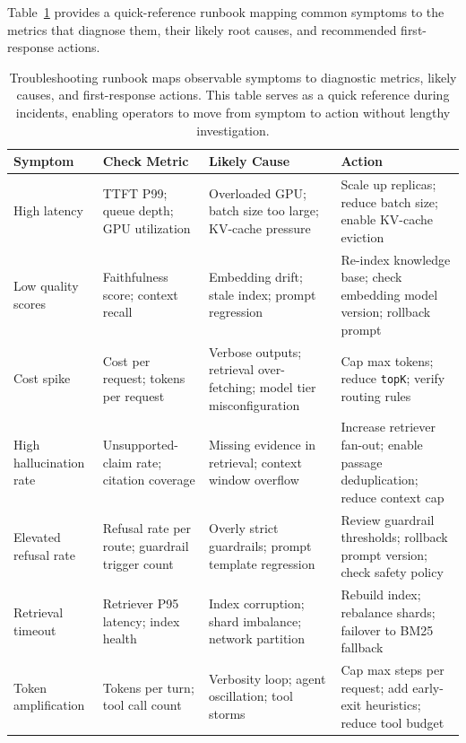 Table~\ref{tab:ch05_troubleshooting_runbook} provides a quick-reference runbook mapping common symptoms to the metrics that diagnose them, their likely root causes, and recommended first-response actions.

\begin{table}[t]
\centering
\small
\caption{Troubleshooting runbook maps observable symptoms to diagnostic metrics, likely causes, and first-response actions. This table serves as a quick reference during incidents, enabling operators to move from symptom to action without lengthy investigation.}
\label{tab:ch05_troubleshooting_runbook}
\setlength{\tabcolsep}{5pt}
\renewcommand{\arraystretch}{1.3}
\begin{tabularx}{\linewidth}{@{}>{\raggedright\arraybackslash}p{2.4cm}>{\raggedright\arraybackslash}p{2.4cm}>{\raggedright\arraybackslash}X>{\raggedright\arraybackslash}X@{}}
\toprule
\rowcolor{gray!15}
\textbf{Symptom} & \textbf{Check Metric} & \textbf{Likely Cause} & \textbf{Action} \\
\midrule
High latency & TTFT P99; queue depth; GPU utilization & Overloaded GPU; batch size too large; KV-cache pressure & Scale up replicas; reduce batch size; enable KV-cache eviction \\
\addlinespace[2pt]
Low quality scores & Faithfulness score; context recall & Embedding drift; stale index; prompt regression & Re-index knowledge base; check embedding model version; rollback prompt \\
\addlinespace[2pt]
Cost spike & Cost per request; tokens per request & Verbose outputs; retrieval over-fetching; model tier misconfiguration & Cap max tokens; reduce \texttt{topK}; verify routing rules \\
\addlinespace[2pt]
High hallucination rate & Unsupported-claim rate; citation coverage & Missing evidence in retrieval; context window overflow & Increase retriever fan-out; enable passage deduplication; reduce context cap \\
\addlinespace[2pt]
Elevated refusal rate & Refusal rate per route; guardrail trigger count & Overly strict guardrails; prompt template regression & Review guardrail thresholds; rollback prompt version; check safety policy \\
\addlinespace[2pt]
Retrieval timeout & Retriever P95 latency; index health & Index corruption; shard imbalance; network partition & Rebuild index; rebalance shards; failover to BM25 fallback \\
\addlinespace[2pt]
Token amplification & Tokens per turn; tool call count & Verbosity loop; agent oscillation; tool storms & Cap max steps per request; add early-exit heuristics; reduce tool budget \\
\bottomrule
\end{tabularx}
\end{table}

